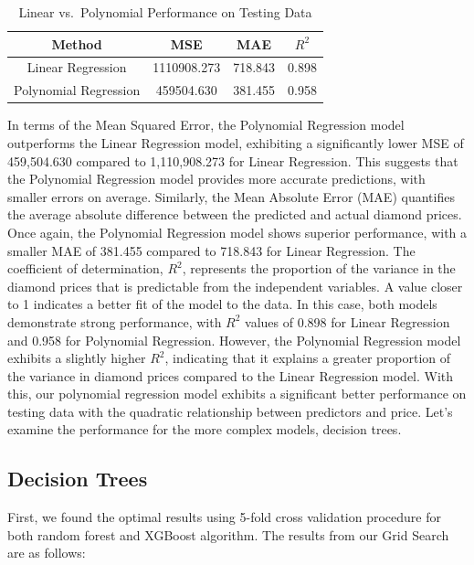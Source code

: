 \documentclass[conference]{IEEEtran}
\begin{document}
\begin{table}[h]
\centering
\caption{Linear vs.\ Polynomial Performance on Testing Data}
\begin{tabular}{|c|c|c|c|}
\hline
Method & MSE & MAE & $R^2$ \\
\hline
Linear Regression & 1110908.273 & 718.843 & 0.898 \\
\hline
Polynomial Regression &  459504.630 & 381.455 & 0.958 \\
\hline
\end{tabular}
\label{tab:mytable}
\end{table}

In terms of the Mean Squared Error, the Polynomial Regression model outperforms the Linear Regression model, exhibiting a significantly lower MSE of 459,504.630 compared to 1,110,908.273 for Linear Regression. This suggests that the Polynomial Regression model provides more accurate predictions, with smaller errors on average. Similarly, the Mean Absolute Error (MAE) quantifies the average absolute difference between the predicted and actual diamond prices. Once again, the Polynomial Regression model shows superior performance, with a smaller MAE of 381.455 compared to 718.843 for Linear Regression. The coefficient of determination, $R^2$, represents the proportion of the variance in the diamond prices that is predictable from the independent variables. A value closer to 1 indicates a better fit of the model to the data. In this case, both models demonstrate strong performance, with $R^2$ values of 0.898 for Linear Regression and 0.958 for Polynomial Regression. However, the Polynomial Regression model exhibits a slightly higher $R^2$, indicating that it explains a greater proportion of the variance in diamond prices compared to the Linear Regression model. With this, our polynomial regression model exhibits a significant better performance on testing data with the quadratic relationship between predictors and price. Let's examine the performance for the more complex models, decision trees. 

\subsection{Decision Trees}

First, we found the optimal results using 5-fold cross validation procedure for both random forest and XGBoost algorithm. The results from our Grid Search are as follows: 
\end{document}
